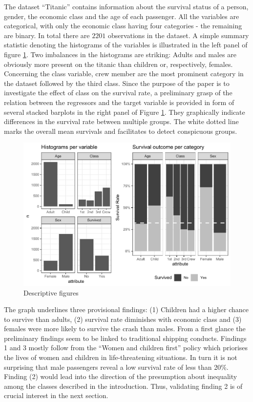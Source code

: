 \documentclass[
]{article}
\begin{document}
The dataset ``Titanic'' contains information about the survival status
of a person, gender, the economic class and the age of each passenger.
All the variables are categorical, with only the economic class having
four categories - the remaining are binary. In total there are \(2201\)
observations in the dataset. A simple summary statistic denoting the
histograms of the variables is illustrated in the left panel of figure
\ref{fig:categories}. Two imbalances in the histograms are striking:
Adults and males are obviously more present on the titanic than children
or, respectively, females. Concerning the class variable, crew member
are the most prominent category in the dataset followed by the third
class. Since the purpose of the paper is to investigate the effect of
class on the survival rate, a preliminary grasp of the relation between
the regressors and the target variable is provided in form of several
stacked barplots in the right panel of Figure \ref{fig:categories}. They
graphically indicate differences in the survival rate between multiple
groups. The white dotted line marks the overall mean survivals and
facilitates to detect conspicuous groups.

\begin{figure}[h]

{\centering \includegraphics{Project-5_files/figure-latex/categories-1} 

}

\caption{Descriptive figures}\label{fig:categories}
\end{figure}

The graph underlines three provisional findings: (1) Children had a
higher chance to survive than adults, (2) survival rate diminishes with
economic class and (3) females were more likely to survive the crash
than males. From a first glance the preliminary findings seem to be
linked to traditional shipping conducts. Findings 1 and 3 mostly follow
from the ``Women and children first'' policy which priorises the lives
of women and children in life-threatening situations. In turn it is not
surprising that male passengers reveal a low survival rate of less than
20\%. Finding (2) would lead into the direction of the presumption about
inequality among the classes described in the introduction. Thus,
validating finding 2 is of crucial interest in the next section.
\end{document}

